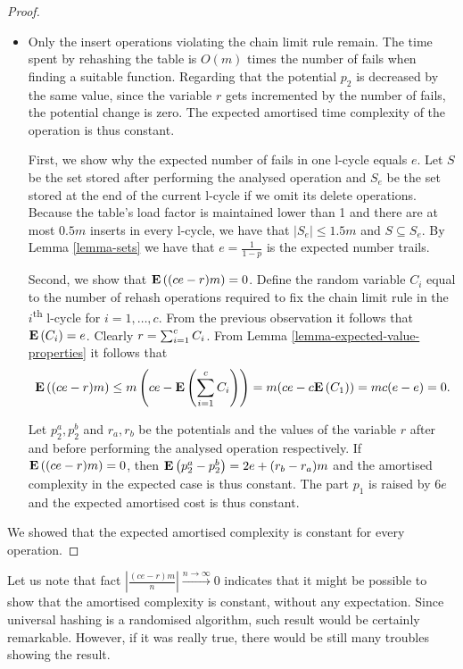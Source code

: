\begin{proof}
\begin{itemize}
\item Only the insert operations violating the chain limit rule remain. The time spent by rehashing the table is $O(m)$ times the number of fails when finding a suitable function. Regarding that the potential $p_2$ is decreased by the same value, since the variable $r$ gets incremented by the number of fails, the potential change is zero. The expected amortised time complexity of the operation is thus constant.

First, we show why the expected number of fails in one l-cycle equals $e$. Let $S$ be the set stored after performing the analysed operation and $S_e$ be the set stored at the end of the current l-cycle if we omit its delete operations. Because the table's load factor is maintained lower than 1 and there are at most $0.5 m$ inserts in every l-cycle, we have that $|S_e| \leq 1.5m$ and $S \subseteq S_e$. By Lemma \ref{lemma-sets} we have that $e = \frac{1}{1 - p}$ is the expected number trails.

Second, we show that $\mathbf{E}\left((ce - r)m\right) = 0$. Define the random variable $C_i$ equal to the number of rehash operations required to fix the chain limit rule in the $i$\textsuperscript{th} l-cycle for $i = 1, \dots, c$. From the previous observation it follows that $\mathbf{E}\left(C_i\right) = e$. Clearly $r = \sum\displaylimits_{i = 1}^{c} C_i$. From Lemma \ref{lemma-expected-value-properties} it follows that
\[
	\mathbf{E}\left({(ce - r)m}\right) \leq {m}\left(ce - \mathbf{E}\left(\displaystyle\sum_{i = 1}^{c} C_i\right)\right) = m(ce - c\mathbf{E}\left(C_1\right)) = mc(e - e) = 0 \text{.}
\]

Let $p_2^a, p_2^b$ and $r_a, r_b$ be the potentials and the values of the variable $r$ after and before performing the analysed operation respectively. If $\mathbf{E}\left((ce - r)m\right) = 0$, then $\mathbf{E}\left(p_2^{a} - p_2^{b}\right) = 2e + (r_b - r_a)m$ and the amortised complexity in the expected case is thus constant. The part $p_1$ is raised by $6e$ and the expected amortised cost is thus constant.
\end{itemize}

We showed that the expected amortised complexity is constant for every operation.
\end{proof}

Let us note that fact $\left|\frac{(ce - r)m}{n}\right| \xrightarrow{n \rightarrow \infty} 0$ indicates that it might be possible to show that the amortised complexity is constant, without any expectation. Since universal hashing is a randomised algorithm, such result would be certainly remarkable. However, if it was really true, there would be still many troubles showing the result.

